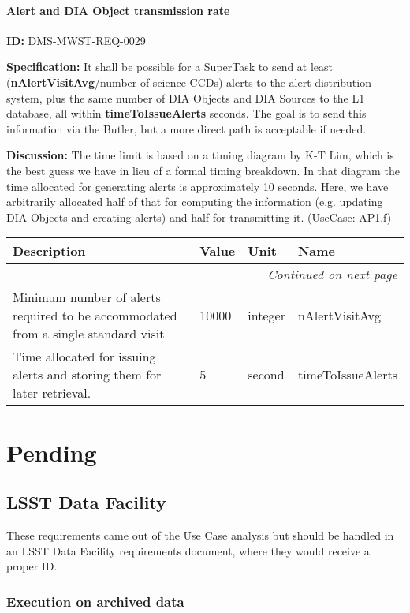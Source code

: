 \documentclass[SE,toc,lsstdraft]{lsstdoc}
\makeatletter
\newcommand{\paramname}[1]{\hspace{0pt}#1}
\newcommand{\unitname}[1]{\hspace{0pt}#1}
\newenvironment{parameters}[0]{%
\setlength\LTleft{0pt}
\setlength\LTright{\fill}
\begin{small}
\begin{longtable}[]{|p{0.49\textwidth}|l|p{0.6in}|p{1.70in}@{}|}

\hline \textbf{Description} & \textbf{Value} & \textbf{Unit} & \textbf{Name} \\ \hline
\endhead

\hline \multicolumn{4}{r}{\emph{Continued on next page}} \\
\endfoot

\hline\hline
\endlastfoot
}{%
\hline
\end{longtable}
\end{small}
}
\makeatother
\begin{document}
\paragraph{Alert and DIA Object transmission rate}\hfill  %

\label{DMS-MWST-REQ-0029}
\textbf{ID:} DMS-MWST-REQ-0029

\textbf{Specification:}
It shall be possible for a SuperTask to send at least (\textbf{nAlertVisitAvg}/number of science CCDs) alerts to the alert distribution system, plus the same number of DIA Objects and DIA Sources to the L1 database, all within \textbf{timeToIssueAlerts} seconds. The goal is to send this information via the Butler, but a more direct path is acceptable if needed.

\textbf{Discussion:}
The time limit is based on a timing diagram by K-T Lim, which is the best guess we have in lieu of a formal timing breakdown. In that diagram the time allocated for generating alerts is approximately 10 seconds. Here, we have arbitrarily allocated half of that for computing the information (e.g. updating DIA Objects and creating alerts) and half for transmitting it. (UseCase: AP1.f)

\begin{parameters}
Minimum number of alerts required to be accommodated from a single standard visit
&
10000
&
\unitname{%
integer
}
&
\paramname{%
nAlertVisitAvg
} \\\hline
Time allocated for issuing alerts and storing them for later retrieval.
&
5
&
\unitname{%
second
}
&
\paramname{%
timeToIssueAlerts
} \\\hline
\end{parameters}

\section{Pending}

\subsection{LSST Data Facility}

These requirements came out of the  Use Case analysis but should be handled in an LSST Data Facility requirements document, where they would receive a proper ID.

\subsubsection{Execution on archived data}
\end{document}
